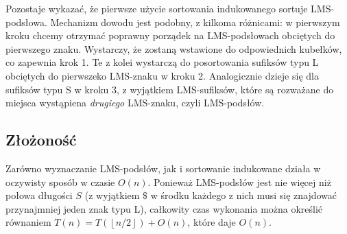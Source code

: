 \documentclass[12pt]{article}
\begin{document}
Pozostaje wykazać, że pierwsze użycie sortowania indukowanego sortuje
LMS-podsłowa. Mechanizm dowodu jest podobny, z kilkoma różnicami: w pierwszym
kroku chcemy otrzymać poprawny porządek na LMS-podsłowach obciętych do
pierwszego znaku. Wystarczy, że zostaną wstawione do odpowiednich kubełków,
co zapewnia krok 1. Te z kolei wystarczą do posortowania sufiksów typu L
obciętych do pierwszeko LMS-znaku w kroku 2. Analogicznie dzieje się dla
sufiksów typu S w kroku 3, z wyjątkiem LMS-sufiksów, które są rozważane
do miejsca wystąpiena \textit{drugiego} LMS-znaku, czyli LMS-podsłów.

\subsection*{Złożoność}

Zarówno wyznaczanie LMS-podsłów, jak i sortowanie indukowane działa w oczywisty
sposób w czasie $O(n)$. Ponieważ LMS-podsłów jest nie więcej niż połowa
długości $S$ (z wyjątkiem \(\$\) w środku każdego z nich musi się znajdować
przynajmniej jeden znak typu L), całkowity czas wykonania można określić
równaniem $T(n) = T(\left \lfloor{n/2}\right \rfloor) + O(n)$, które daje
$O(n)$.
\end{document}
